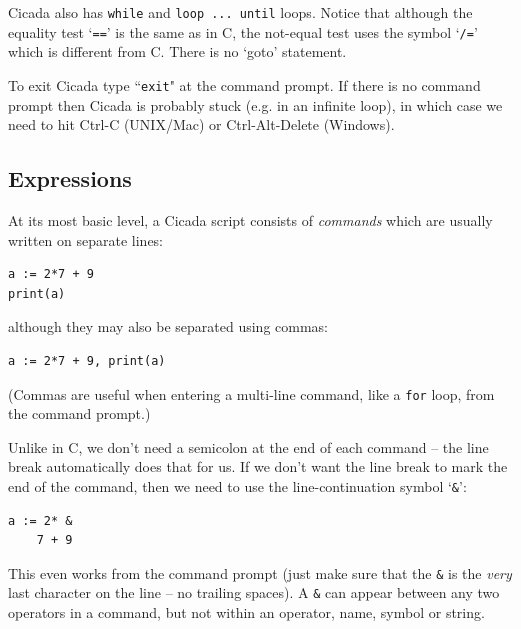 \documentclass{article}
\newenvironment{code}{
       \begin{list}{}{
               \setlength{\leftmargin}{.4in}
               \setlength{\rightmargin}{0in}
               \setlength{\topsep}{.2in}
       }
       \small
       \item[] }
       { \end{list}   }
\begin{document}
Cicada also has \texttt{while} and \verb#loop ... until# loops.  Notice that although the equality test `\verb#==#' is the same as in C, the not-equal test uses the symbol `\verb#/=#' which is different from C.  There is no `goto' statement.

To exit Cicada type ``\texttt{exit}" at the command prompt.  If there is no command prompt then Cicada is probably stuck (e.g. in an infinite loop), in which case we need to hit Ctrl-C (UNIX/Mac) or Ctrl-Alt-Delete (Windows).





\subsection{Expressions}

At its most basic level, a Cicada script consists of \emph{commands} which are usually written on separate lines:

\begin{code} \begin{verbatim}
a := 2*7 + 9
print(a)
\end{verbatim} \end{code}

\noindent although they may also be separated using commas:

\begin{code} \begin{verbatim}
a := 2*7 + 9, print(a)
\end{verbatim} \end{code}

\noindent (Commas are useful when entering a multi-line command, like a \verb#for# loop, from the command prompt.)

Unlike in C, we don't need a semicolon at the end of each command -- the line break automatically does that for us.  If we don't want the line break to mark the end of the command, then we need to use the line-continuation symbol `\texttt{\&}':

\begin{code} \begin{verbatim}
a := 2* &
    7 + 9
\end{verbatim} \end{code}

\noindent This even works from the command prompt (just make sure that the \texttt{\&} is the \emph{very} last character on the line -- no trailing spaces).  A \verb#&# can appear between any two operators in a command, but not within an operator, name, symbol or string.
\end{document}
